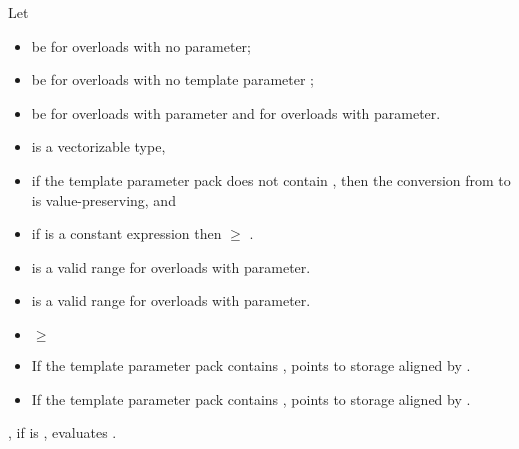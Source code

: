 \begin{itemdescr}
  \pnum
  Let
  \begin{itemize}
    \item {} be  for overloads with no
       parameter;
    \item {} be  for overloads with no template parameter
      ;
    \item {} be  for overloads with  parameter and
       for overloads with  parameter.
  \end{itemize}

  \pnum\mandates
  \begin{itemize}
    \item {} is a vectorizable type,
    \item if the template parameter pack  does not contain \tcode{\convertflag}, then
      the conversion from  to  is value-preserving, and
    \item if  is a constant expression then  $\ge$
      .
  \end{itemize}

  \pnum\expects
  \begin{itemize}
    \item {} is a valid range for overloads with  parameter.
    \item {} is a valid range for overloads with  parameter.
    \item {} $\ge$ 
    \item If the template parameter pack  contains \tcode{\alignedflag},
       points to storage aligned by .
    \item If the template parameter pack  contains ,
       points to storage aligned by .
  \end{itemize}

  \pnum\effects
  , if  is , evaluates .
\end{itemdescr}

